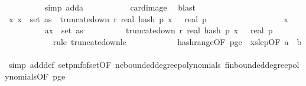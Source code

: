 \begin{isabellebody}
\ \ \ \ \ \ \ \ \isamarkupfalse%
\ {\isacharparenleft}{\kern0pt}simp\ add{\isacharcolon}{\kern0pt}a{\isacharunderscore}{\kern0pt}{}{\isacharparenright}{\kern0pt}\ \isanewline
\ \ \ \ \ \ \ \ \isamarkupfalse%
\ card{\isacharunderscore}{\kern0pt}image\ \isamarkupfalse%
\ blast\isanewline
\ \ \ \ \ \ \isamarkupfalse%
\ \isamarkupfalse%
\ {\isachardoublequoteopen}{\isasymAnd}x{\isachardot}{\kern0pt}\ x\ {\isasymin}\ set\ as\ {\isasymLongrightarrow}\ truncate{\isacharunderscore}{\kern0pt}down\ r\ {\isacharparenleft}{\kern0pt}real\ {\isacharparenleft}{\kern0pt}hash\ p\ x\ {\isasymomega}{\isacharparenright}{\kern0pt}{\isacharparenright}{\kern0pt}\ {\isasymle}\ real\ p{\isachardoublequoteclose}\isanewline
\ \ \ \ \ \ \isamarkupfalse%
\ {\isacharminus}{\kern0pt}\isanewline
\ \ \ \ \ \ \ \ \isamarkupfalse%
\ x\isanewline
\ \ \ \ \ \ \ \ \isamarkupfalse%
\ a{\isacharcolon}{\kern0pt}{\isachardoublequoteopen}x\ {\isasymin}\ set\ as{\isachardoublequoteclose}\isanewline
\ \ \ \ \ \ \ \ \isamarkupfalse%
\ {\isachardoublequoteopen}truncate{\isacharunderscore}{\kern0pt}down\ r\ {\isacharparenleft}{\kern0pt}real\ {\isacharparenleft}{\kern0pt}hash\ p\ x\ {\isasymomega}{\isacharparenright}{\kern0pt}{\isacharparenright}{\kern0pt}\ {\isasymle}\ real\ p{\isachardoublequoteclose}\isanewline
\ \ \ \ \ \ \ \ \ \ \isamarkupfalse%
\ {\isacharparenleft}{\kern0pt}rule\ truncate{\isacharunderscore}{\kern0pt}down{\isacharunderscore}{\kern0pt}le{\isacharparenright}{\kern0pt}\isanewline
\ \ \ \ \ \ \ \ \ \ \isamarkupfalse%
\ hash{\isacharunderscore}{\kern0pt}range{\isacharbrackleft}{\kern0pt}OF\ p{\isacharunderscore}{\kern0pt}ge{\isacharunderscore}{\kern0pt}{}\ {\isacharunderscore}{\kern0pt}\ xs{\isacharunderscore}{\kern0pt}le{\isacharunderscore}{\kern0pt}p{\isacharbrackleft}{\kern0pt}OF\ a{\isacharbrackright}{\kern0pt}{\isacharbrackright}{\kern0pt}\ \ b\isanewline
\ \ \ \ \ \ \ \ \ \ \isamarkupfalse%
\ {\isacharparenleft}{\kern0pt}simp\ add{\isacharcolon}{\kern0pt}{\isasymOmega}def\ set{\isacharunderscore}{\kern0pt}pmf{\isacharunderscore}{\kern0pt}of{\isacharunderscore}{\kern0pt}set{\isacharbrackleft}{\kern0pt}OF\ ne{\isacharunderscore}{\kern0pt}bounded{\isacharunderscore}{\kern0pt}degree{\isacharunderscore}{\kern0pt}polynomials\ fin{\isacharunderscore}{\kern0pt}bounded{\isacharunderscore}{\kern0pt}degree{\isacharunderscore}{\kern0pt}polynomials{\isacharbrackleft}{\kern0pt}OF\ p{\isacharunderscore}{\kern0pt}ge{\isacharunderscore}{\kern0pt}{}{\isacharbrackright}{\kern0pt}{\isacharbrackright}{\kern0pt}{\isacharparenright}{\kern0pt}\isanewline

\end{isabellebody}
